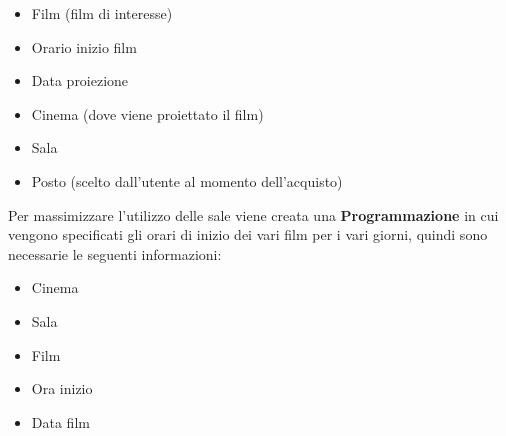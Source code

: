 \documentclass[10pt]{article}
\begin{document}
	\begin{itemize}		
		\item Film (film di interesse)
		\item Orario inizio film
		\item Data proiezione
		\item Cinema (dove viene proiettato il film)
		\item Sala
		\item Posto (scelto dall'utente al momento dell'acquisto)
	\end{itemize}
 	Per massimizzare l'utilizzo delle sale viene creata una \textbf{Programmazione} in cui vengono specificati gli orari di inizio dei vari film per i vari giorni, quindi sono necessarie le seguenti informazioni:
 	\begin{itemize}
 		\item Cinema
 		\item Sala
 		\item Film
 		\item Ora inizio
 		\item Data film
 	\end{itemize} 
\end{document}
